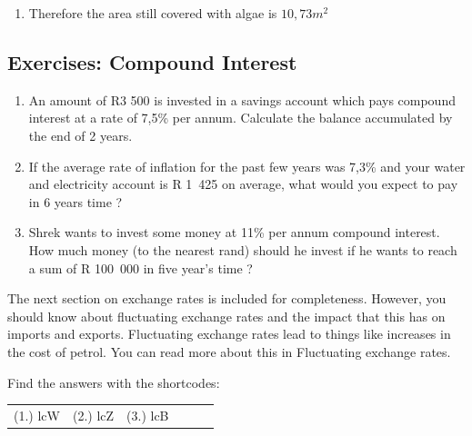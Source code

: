 {\begin{mdframed}[linewidth=4, leftmargin=40, rightmargin=40]
\begin{exercise}
\begin{enumerate}[noitemsep, label=\textbf{Step} \textbf{\arabic*}. ]
    \begin{equation}
    \begin{array}{ccc}\hfill \mathrm{A}& =& P{\left(1-i\right)}^{n}\hfill \\ & =& 50{\left(1-0,05\right)}^{30}\hfill \\ & =& 10,73{m}^{2}\hfill \end{array}\tag{3.35}
      \end{equation}
        \item  
        \label{m39334*id75256}Therefore the area still covered with algae is $10,73{m}^{2}$
 \par 
        \end{enumerate}
    \end{exercise}
    \end{mdframed}
    }
    \noindent
\label{m39334*secfhsst!!!underscore!!!id3169}
            \subsection{Exercises: Compound Interest }
            \nopagebreak
            \label{m39334*id75300}\begin{enumerate}[noitemsep, label=\textbf{\arabic*}. ] 
            \label{m39334*uid74}\item An amount of R3 500 is invested in a savings account which pays compound interest at a rate of 7,5\% per annum. Calculate the balance accumulated by the end of 2 years.\newline
\label{m39334*uid75}\item If the average rate of inflation for the past few years was 7,3\% and your water and electricity account is R 1~425 on average, what would you expect to pay in 6 years time ?\newline
\label{m39334*uid76}\item Shrek wants to invest some money at 11\% per annum compound interest. How much money (to the nearest rand) should he invest if he wants to reach a sum of R 100~000 in five year's time ?\newline
\end{enumerate}
  \label{m39334*eip-523}The next section on exchange rates is included for completeness. However, you should know about fluctuating exchange rates and the impact that this has on imports and exports. Fluctuating exchange rates lead to things like increases in the cost of petrol. You can read more about this in Fluctuating exchange rates.\par 
  \label{m39334**end}
\par {} Find the answers with the shortcodes:
 \par \begin{tabular}[h]{cccccc}
 (1.) lcW  &  (2.) lcZ  &  (3.) lcB  & \end{tabular}

